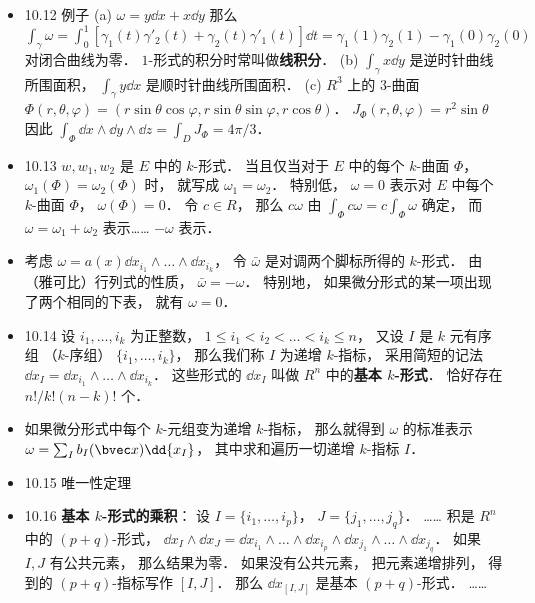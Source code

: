 \begin{itemize}
\item 10.12 例子 (a) $\omega=y\dd{x}+x\dd{y}$ 那么 $\int_\gamma \omega = \int_0^1 [\gamma_1(t)\gamma'_2(t)+\gamma_2(t)\gamma'_1(t)]\dd{t} = \gamma_1(1)\gamma_2(1)-\gamma_1(0)\gamma_2(0)$ 对闭合曲线为零． $1$-形式的积分时常叫做\textbf{线积分}． (b) $\int_\gamma x\dd{y}$ 是逆时针曲线所围面积， $\int_\gamma y\dd{x}$ 是顺时针曲线所围面积． (c) $R^3$ 上的 $3$-曲面 $\Phi(r,\theta,\varphi)=(r\sin\theta\cos\varphi,r\sin\theta\sin\varphi, r\cos\theta)$． $J_\Phi(r,\theta,\varphi) = r^2\sin\theta$ 因此 $\int_\Phi \dd{x}\wedge\dd{y}\wedge\dd{z} = \int_D J_\Phi = 4\pi/3$．

\item 10.13 $w,w_1,w_2$ 是 $E$ 中的 $k$-形式． 当且仅当对于 $E$ 中的每个 $k$-曲面 $\Phi$， $\omega_1(\Phi)=\omega_2(\Phi)$ 时， 就写成 $\omega_1 =\omega_2$． 特别低， $\omega=0$ 表示对 $E$ 中每个 $k$-曲面 $\Phi$， $\omega(\Phi)=0$． 令 $c\in R$， 那么 $c\omega$ 由 $\int_\Phi c\omega=c\int_\Phi \omega$ 确定， 而 $\omega = \omega_1+\omega_2$ 表示…… $-\omega$ 表示．

\item 考虑 $\omega=a(x)\dd{x_{i_1}}\wedge\dots\wedge \dd{x_{i_k}}$， 令 $\bar\omega$ 是对调两个脚标所得的 $k$-形式． 由（雅可比）行列式的性质， $\bar\omega=-\omega$． 特别地， 如果微分形式的某一项出现了两个相同的下表， 就有 $\omega=0$．

\item 10.14 设 $i_1,\dots,i_k$ 为正整数， $1\leqslant i_1<i_2<\dots<i_k\leqslant n$， 又设 $I$ 是 $k$ 元有序组 （$k$-序组） $\{i_1,\dots,i_k\}$， 那么我们称 $I$ 为递增 $k$-指标， 采用简短的记法 $\dd{x_I}=\dd{x_{i_1}}\wedge\dots\wedge\dd{x_{i_k}}$． 这些形式的 $\dd{x_I}$ 叫做 $R^n$ 中的\textbf{基本 $k$-形式}． 恰好存在 $n!/k!(n-k)!$ 个．

\item 如果微分形式中每个 $k$-元组变为递增 $k$-指标， 那么就得到 $\omega$ 的标准表示 $\omega=\sum_I b_I(\bvec x)\dd{x_I}$， 其中求和遍历一切递增 $k$-指标 $I$．

\item 10.15 唯一性定理

\item 10.16 \textbf{基本 $k$-形式的乘积}： 设 $I=\{i_1,\dots,i_p\}$， $J=\{j_1,\dots,j_q\}$． …… 积是 $R^n$ 中的 $(p+q)$-形式， $\dd{x_I}\wedge \dd{x_J} = \dd{x_{i_1}} \wedge \dots \wedge \dd{x_{i_p}} \wedge \dd{x_{j_1}}\wedge \dots \wedge \dd{x_{j_q}}$． 如果 $I,J$ 有公共元素， 那么结果为零． 如果没有公共元素， 把元素递增排列， 得到的 $(p+q)$-指标写作 $[I,J]$． 那么 $\dd{x_{[I,J]}}$ 是基本 $(p+q)$-形式． ……


\end{itemize}
